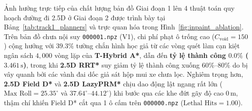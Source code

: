 \documentclass[a4paper,fleqn]{cas-sc}
\begin{document}
\begin{table}[width=\linewidth,pos=htbp]
\caption{Thống kê định lượng chất lượng bản đồ Giai đoạn 1 trên chuỗi \texttt{000001}--\texttt{000005} (trung bình $\pm$ độ lệch chuẩn) và đối chiếu hai khung cảnh đặc trưng (\texttt{000001} so với \texttt{000500}).}
\label{tab:phase1_stats}
\centering
{}
\end{table}

Ảnh hưởng trực tiếp của chất lượng bản đồ Giai đoạn 1 lên 4 thuật toán quy hoạch đường đi 2.5D ở Giai đoạn 2 được trình bày tại Bảng~\ref{tab:track1_planners} và trực quan hóa trong Hình~\ref{fig:inpaint_ablation}. Trên bản đồ chưa nội suy \texttt{000001.npz} (V1), chi phí phạt ô trống cao ($C_{\text{void}} = 150$) cộng hưởng với $39.3\%$ tường chắn hình học giả từ các vòng quét làm cạn kiệt ngân sách $4{,}000$ vòng lặp của \textbf{T-Hybrid A*}, dẫn đến \textbf{tỷ lệ thành công $0.0\%$ ($3.461\,\text{s}$)}, trong khi \textbf{2.5D RRT*} suy giảm tỷ lệ thành công xuống $60\%\text{--}80\%$ do bị vây quanh bởi các vành đai dốc giả sát hộp mui xe chưa lọc. Nghiêm trọng hơn, \textbf{2.5D Field D*} và \textbf{2.5D LazyPRM*} chịu dao động lật ngang rất lớn ($\text{Max Roll} = 25.35^\circ$ và $37.64^\circ\text{--}44.12^\circ$) khi bước qua các khe đứt gãy độ cao $0\,\text{m}$, thậm chí khiến Field D* cắt qua 1 ô cấm trên \texttt{000000.npz} ($\text{Lethal Hits} = 1.00$).
\end{document}
